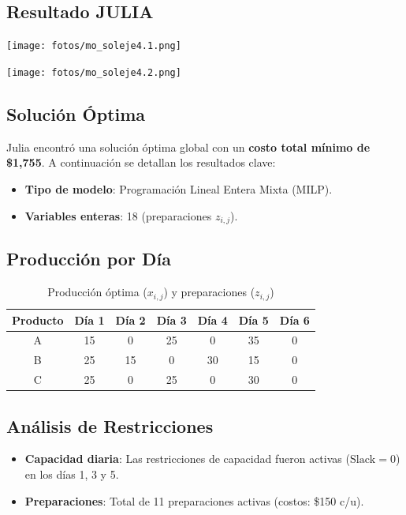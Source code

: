 \documentclass[12pt, a4paper, oneside]{book}
\theoremstyle{definition}
\begin{document}
    \subsection{Resultado JULIA}

    \begin{center}
    \texttt{[image: fotos/mo\_soleje4.1.png]}
    \end{center}

    \begin{center}
    \texttt{[image: fotos/mo\_soleje4.2.png]}
    \end{center}

    \subsection{Solución Óptima}
    Julia encontró una solución óptima global con un \textbf{costo total mínimo de \$1,755}. A continuación se detallan los resultados clave:

    \begin{itemize}
        \item \textbf{Tipo de modelo}: Programación Lineal Entera Mixta (MILP).
        \item \textbf{Variables enteras}: 18 (preparaciones $z_{i,j}$).
    \end{itemize}

    \subsection{Producción por Día}
    \begin{table}[h!]
    \centering
    \caption{Producción óptima ($x_{i,j}$) y preparaciones ($z_{i,j}$)}
    \begin{tabular}{|c|c|c|c|c|c|c|}
    \hline
    \textbf{Producto} & \textbf{Día 1} & \textbf{Día 2} & \textbf{Día 3} & \textbf{Día 4} & \textbf{Día 5} & \textbf{Día 6} \\ \hline
    A & 15  & 0  & 25  & 0  & 35  & 0  \\ \hline
    B & 25  & 15  & 0  & 30  & 15  & 0  \\ \hline
    C & 25  & 0  & 25  & 0  & 30  & 0  \\ \hline
    \end{tabular}
    \label{tab:produccion}
    \end{table}



    \subsection{Análisis de Restricciones}
    \begin{itemize}
        \item \textbf{Capacidad diaria}: Las restricciones de capacidad fueron activas ($\text{Slack} = 0$) en los días 1, 3 y 5.
        \item \textbf{Preparaciones}: Total de 11 preparaciones activas (costos: \$150 c/u).
    \end{itemize}
\end{document}
